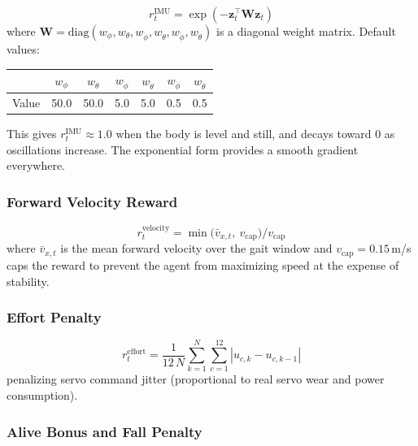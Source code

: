 \documentclass[11pt]{article}
\begin{document}
\begin{equation}
r_t^{\mathrm{IMU}} = \exp\!\left(-\mathbf{z}_t^\top \mathbf{W} \mathbf{z}_t\right)
\label{eq:imu-reward}
\end{equation}
where $\mathbf{W}=\mathrm{diag}(w_\phi, w_\theta, w_{\dot\phi}, w_{\dot\theta}, w_{\ddot\phi}, w_{\ddot\theta})$ is a diagonal weight matrix. Default values:

\begin{center}
\begin{tabular}{lcccccc}
\toprule
& $w_\phi$ & $w_\theta$ & $w_{\dot\phi}$ & $w_{\dot\theta}$ & $w_{\ddot\phi}$ & $w_{\ddot\theta}$ \\
\midrule
Value & 50.0 & 50.0 & 5.0 & 5.0 & 0.5 & 0.5 \\
\bottomrule
\end{tabular}
\end{center}

This gives $r_t^{\mathrm{IMU}} \approx 1.0$ when the body is level and still, and decays toward $0$ as oscillations increase. The exponential form provides a smooth gradient everywhere.

\subsubsection{Forward Velocity Reward}

\begin{equation}
r_t^{\mathrm{velocity}} = \min\!\bigl(\bar{v}_{x,t},\ v_{\mathrm{cap}}\bigr) / v_{\mathrm{cap}}
\label{eq:vel-reward}
\end{equation}
where $\bar{v}_{x,t}$ is the mean forward velocity over the gait window and $v_{\mathrm{cap}} = 0.15$\,m/s caps the reward to prevent the agent from maximizing speed at the expense of stability.

\subsubsection{Effort Penalty}

\begin{equation}
r_t^{\mathrm{effort}} = \frac{1}{12\,N}\sum_{k=1}^{N}\sum_{c=1}^{12}|u_{c,k} - u_{c,k-1}|
\label{eq:effort}
\end{equation}
penalizing servo command jitter (proportional to real servo wear and power consumption).

\subsubsection{Alive Bonus and Fall Penalty}
\end{document}
